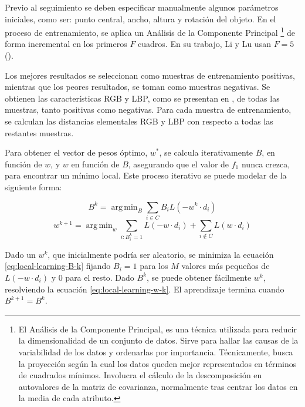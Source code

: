 \documentclass[a4paper,10pt]{article}
\DeclareMathOperator*{\argmin}{arg\,min}
\begin{document}
Previo al seguimiento se deben especificar manualmente algunos parámetros iniciales,
como ser: punto central, ancho, altura y rotación del objeto. En el proceso de
entrenamiento, se aplica un Análisis de la Componente Principal
\footnote{El Análisis de la Componente Principal, es una técnica utilizada para reducir la dimensionalidad de un conjunto de datos.
Sirve para hallar las causas de la variabilidad de los datos y ordenarlas por importancia.
Técnicamente, busca la proyección según la cual los datos queden mejor representados en términos de cuadrados mínimos. Involucra el cálculo de la descomposición en
autovalores de la matriz de covarianza, normalmente tras centrar los datos en la media de cada atributo.}
de forma incremental en los primeros $F$ cuadros. En su trabajo, Li y Lu usan
$F = 5$ (\cite{local-learning}).

Los mejores resultados se seleccionan como muestras de entrenamiento positivas, mientras que
los peores resultados, se toman como muestras negativas. Se obtienen las características
RGB y LBP, como se presentan en \cite{tracking-bag-of-features}, de todas las muestras,
tanto positivas como negativas. Para cada muestra de entrenamiento, se calculan las
distancias elementales RGB y LBP con respecto a todas las restantes muestras.

Para obtener el vector de pesos óptimo, $w^{*}$, se calcula iterativamente $B$,
en función de $w$, y $w$ en función de $B$, asegurando que el valor de $f_{1}$ nunca
crezca, para encontrar un mínimo local. Este proceso iterativo se puede modelar de la
siguiente forma:

\begin{equation}
   \label{eq:local-learning-B-k}
   B^{k} = \argmin_{B} \sum_{i \in C} B_{i}L(-w^{k} \cdot d_{i})
\end{equation}
\begin{equation}
    \label{eq:local-learning-w-k}
    w^{k+1} = \argmin_{w} \sum_{i:B_{i}^{k}=1} L(-w \cdot d_{i}) + \sum_{i\notin C}L(w \cdot d_{i})
\end{equation}

Dado un $w^{k}$, que inicialmente podría ser aleatorio, se minimiza la ecuación
\ref{eq:local-learning-B-k} fijando $B_{i} = 1$ para los $M$ valores más
pequeños de $L(-w \cdot d_{i})$ y $0$ para el resto. Dado $B^{k}$, se puede
obtener fácilmente $w^{k}$, resolviendo la ecuación \ref{eq:local-learning-w-k}.
El aprendizaje termina cuando $B^{k+1}=B^{k}$.\\
\end{document}
